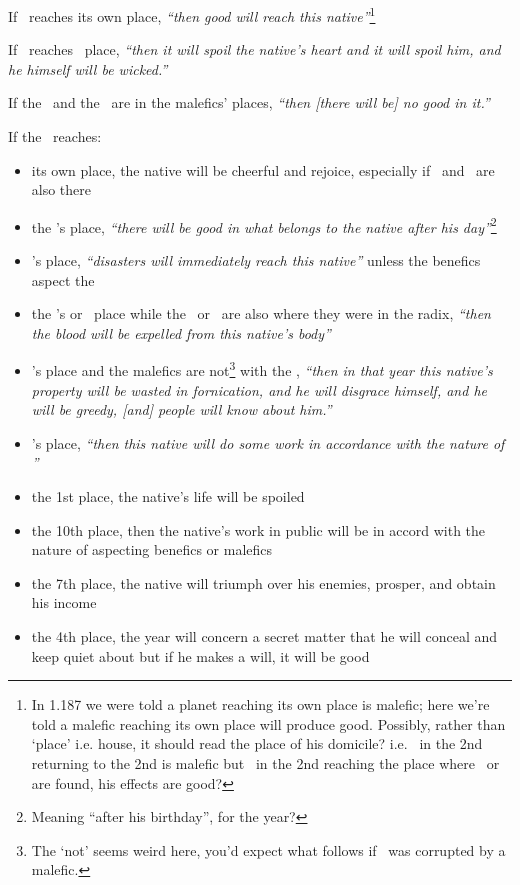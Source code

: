 If  \Saturn\, reaches its own place, \textsl{``then good will reach this native''}\footnote{In 1.187 we were told a planet reaching its own place is malefic; here we're told a malefic reaching its own place will produce good. Possibly, rather than `place' i.e. house, it should read the place of his domicile? i.e. \Saturn\, in the 2nd returning to the 2nd is malefic but \Saturn\, in the 2nd reaching the place where \Capricorn\, or \Aquarius\, are found, his effects are good?}

If  \Saturn\, reaches \Mars\, place, \textsl{``then it will spoil the native's heart and it will spoil him, and he himself will be wicked.''}

If  the \Sun\, and the \Moon\, are in the malefics' places, \textsl{``then [there will be] no good in it.''}

If  the \Moon\, reaches:
\begin{itemize}[topsep=0em,itemsep=0em]
\item its own place, the native will be cheerful and rejoice, especially if \Venus\, and \Jupiter\, are also there

\item the \Sun's place, \textsl{``there will be good in what belongs to the native after his day''}\footnote{Meaning ``after his birthday'', for the year?}

\item \Mars's place, \textsl{``disasters will immediately reach this native''} unless the benefics aspect the \Moon

\item the \Sun's or \Mars\, place while the \Sun\, or \Mars\, are also where they were in the radix, \textsl{``then the blood will be expelled from this native's body''}

\item \Venus's place and the malefics are not\footnote{The `not' seems weird here, you'd expect what follows if \Venus\, was corrupted by a malefic.} with the \Moon, \textsl{``then in that year this native's property will be wasted in fornication, and he will disgrace himself, and he will be greedy, [and] people will know about him.''}

\item \Mercury's place, \textsl{``then this native will do some work in accordance with the nature of \Mercury''}

\item the 1st place, the native's life will be spoiled

\item the 10th place, then the native's work in public will be in accord with the nature of aspecting benefics or malefics

\item the 7th place, the native will triumph over his enemies, prosper, and obtain his income

\item the 4th place, the year will concern a secret matter that he will conceal and keep quiet about but if he makes a will, it will be good
\end{itemize}

